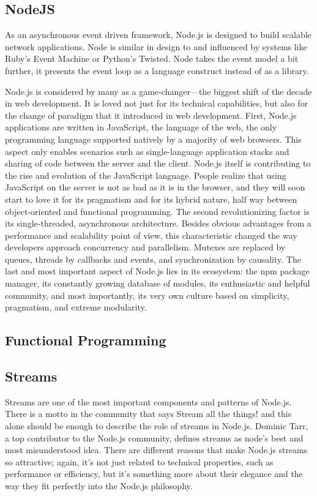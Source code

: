 \documentclass{llncs}
\begin{document}
\subsection{NodeJS}
As an asynchronous event driven framework, Node.js is designed to build scalable network applications. 
Node is similar in design to and influenced by systems like Ruby's Event Machine or Python's Twisted. 
Node takes the event model a bit further, it presents the event loop as a language construct instead of as a library. \cite{nodejsabout}

Node.js is considered by many as a game-changer—the biggest shift of the decade in web development. 
It is loved not just for its technical capabilities, but also for the change of paradigm that it introduced in web development.
First, Node.js applications are written in JavaScript, the language of the web, the only programming language supported natively by a majority of web browsers. 
This aspect only enables scenarios such as single-language application stacks and sharing of code between the server and the client. 
Node.js itself is contributing to the rise and evolution of the JavaScript language.
People realize that using JavaScript on the server is not as bad as it is in the browser, and they will soon start to love it for its pragmatism and for its hybrid nature, half way between object-oriented and functional programming.
The second revolutionizing factor is its single-threaded, asynchronous architecture. 
Besides obvious advantages from a performance and scalability point of view, this characteristic changed the way developers approach concurrency and parallelism. 
Mutexes are replaced by queues, threads by callbacks and events, and synchronization by causality.
The last and most important aspect of Node.js lies in its ecosystem: the npm package manager, its constantly growing database of modules, its enthusiastic and helpful community, and most importantly, its very own culture based on simplicity, pragmatism, and extreme modularity. \cite{nodejsbook}
\subsection{Functional Programming}
\subsection{Streams\cite{nodejsbook}}
Streams are one of the most important components and patterns of Node.js. 
There is a motto in the community that says Stream all the things! and this alone should be enough to describe the role of streams in Node.js. 
Dominic Tarr, a top contributor to the Node.js community, defines streams as node's best and most misunderstood idea. 
There are different reasons that make Node.js streams so attractive; again, it's not just related to technical properties, such as performance or efficiency, but it's something more about their elegance and the way they fit perfectly into the Node.js philosophy.
\end{document}
